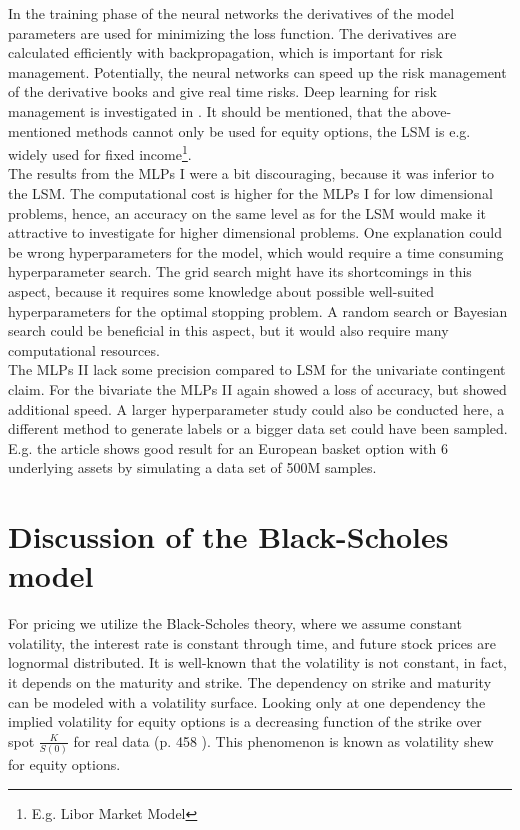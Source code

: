 In the training phase of the neural networks the derivatives of the model parameters are used for minimizing the loss function. The derivatives are calculated efficiently with backpropagation, which is important for risk management. Potentially, the neural networks can speed up the risk management of the derivative books and give real time risks. Deep learning for risk management is investigated in \parencite{AntoineSavine}. It should be mentioned, that the above-mentioned methods cannot only be used for equity options, the LSM is e.g. widely used for fixed income\footnote{E.g. Libor Market Model}.\\

The results from the MLPs I were a bit discouraging, because it was inferior to the LSM. The computational cost is higher for the MLPs I for low dimensional problems, hence, an accuracy on the same level as for the LSM would make it attractive to investigate for higher dimensional problems. One explanation could be wrong hyperparameters for the model, which would require a time consuming hyperparameter search. The grid search might have its shortcomings in this aspect, because it requires some knowledge about possible well-suited hyperparameters for the optimal stopping problem. A random search or Bayesian search could be beneficial in this aspect, but it would also require many computational resources.\\

The MLPs II lack some precision compared to LSM for the univariate contingent claim. For the bivariate the MLPs II again showed a loss of accuracy, but showed additional speed. A larger hyperparameter study could also be conducted here, a different method to generate labels or a bigger data set could have been sampled. E.g. the article \parencite{FergusonRyan2018} shows good result for an European basket option with 6 underlying assets by simulating a data set of 500M samples. 

\section{Discussion of the Black-Scholes model}
For pricing we utilize the Black-Scholes theory, where we assume constant volatility, the interest rate is constant through time, and future stock prices are lognormal distributed. It is well-known that the volatility is not constant, in fact, it depends on the maturity and strike. The dependency on strike and maturity can be modeled with a volatility surface. Looking only at one dependency the implied volatility for equity options is a decreasing function of the strike over spot $\frac{K}{S(0)}$ for real data (p. 458 \parencite{Hull}). This phenomenon is known as volatility shew for equity options. \\

